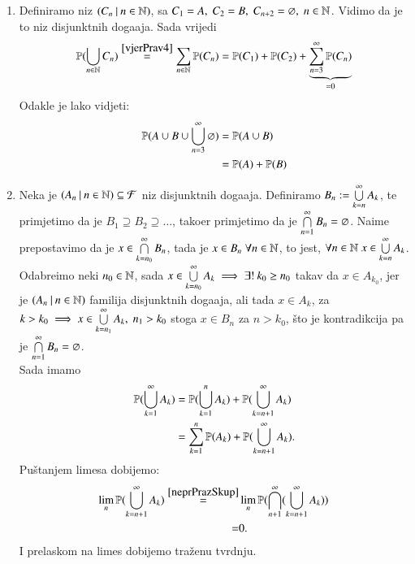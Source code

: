 \begin{rj}
    \begin{enumerate}[label=(\alph*)]
        \item Definiramo niz $({C_n} \: | \: {n \in \mathbb{N}})$, sa $C_1 = A,
            \; C_2 = B, \; C_{n + 2} = \varnothing, \; n \in \mathbb{N}$.
            Vidimo da je to niz disjunktnih doga\dj aja.
            Sada vrijedi
            \begin{equation*}
                \mathbb{P}({\bigcup\limits_{n \in \mathbb{N}}^{} C_n})
                \overset{\eqref{vjerPrav4}}{=} \sum\limits_{n \in \mathbb{N}}^{}
                \mathbb{P}({C_n}) = \mathbb{P}({C_1}) + \mathbb{P}({C_2})
                + \underbrace{\sum\limits_{n = 3}^{\infty} \mathbb{P}({C_n})}_{=0}
            \end{equation*}
            Odakle je lako vidjeti:
            \begin{align*}
                \mathbb{P}({A \cup B \cup \bigcup\limits_{n = 3}^{\infty}
                \varnothing}) &= \mathbb{P}({A \cup B}) \\
                &= \mathbb{P}({A}) + \mathbb{P}({B})
            \end{align*}
        \item Neka je $({A_n} \: | \: {n \in \mathbb{N}}) \subseteq \mathcal{F}$ niz
            disjunktnih doga\dj aja. Definiramo $B_n :=
            \bigcup\limits_{k = n}^{\infty} A_k$, te primjetimo da je
            $B_1 \supseteq B_2 \supseteq \dots$, tako\dj er
            primjetimo da je $\bigcap\limits_{n = 1}^{\infty} B_n =
            \varnothing$. Naime prepostavimo da je $x \in
            \bigcap\limits_{k = n_0}^{\infty} B_n$, tada je $x \in B_n
            \; \forall n \in \mathbb{N}$, to jest, $ \forall n \in \mathbb{N} \;
            x \in \bigcup\limits_{k = n}^{\infty} A_k$.
            Odabreimo neki $n_0 \in \mathbb{N}$, sada $x \in
            \bigcup\limits_{k = n_0}^{\infty} A_k \implies \exists ! \: k_0
            \geq n_0$ takav da $x \in A_{k_0}$, jer je
            $({A_n} \: | \: {n \in \mathbb{N}})$ familija disjunktnih doga\dj aja,
            ali tada $x \in A_k$, za $k > k_0 \implies x  \in
            \bigcup\limits_{k = n_1}^{\infty} A_k, \; n_1 > k_0$ stoga
            $x \in B_n$ za $n > k_0$, \v sto je kontradikcija pa je
            $\bigcap\limits_{n = 1}^{\infty} B_n = \varnothing$.\\
            Sada imamo
            \begin{align*}
                \mathbb{P}({\bigcup\limits_{k = 1}^{\infty} A_k})
                &= \mathbb{P}({\bigcup\limits_{k = 1}^{n} A_k})
                + \mathbb{P}({\bigcup\limits_{k = n + 1}^{\infty} A_k}) \\
                &= \sum\limits_{k = 1}^{n} \mathbb{P}({A_k})
                + \mathbb{P}({\bigcup\limits_{k = n + 1}^{\infty} A_k}). 
            \end{align*}
            Pu\v stanjem limesa dobijemo:
            \begin{align*}
                \lim_n \mathbb{P}({\bigcup\limits_{k = n + 1}^{\infty} A_k})
                \overset{\eqref{neprPrazSkup}}{=}& \lim_n
                \mathbb{P}({\bigcap\limits_{n + 1}^{\infty}(
                    \bigcup\limits_{k = n + 1}^{\infty} A_k)})\\
                =& 0.
            \end{align*}
            I prelaskom na limes dobijemo tra\v zenu tvrdnju.
    \end{enumerate}
\end{rj}

